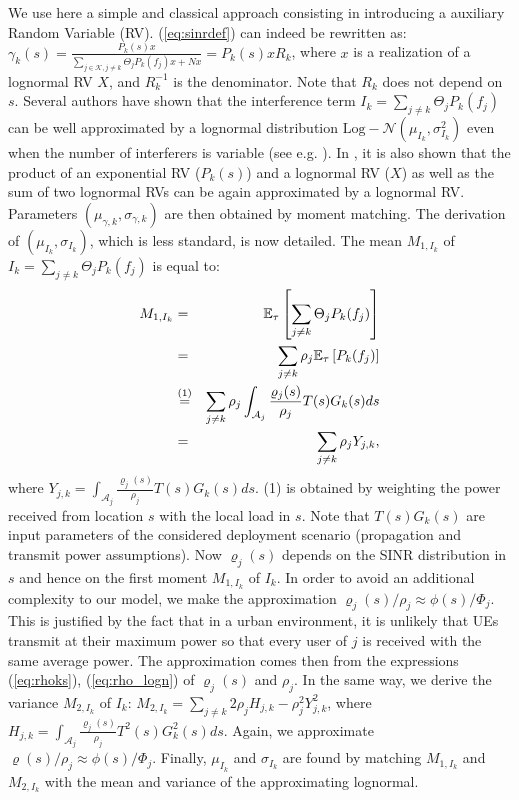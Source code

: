 \documentclass[draftcls,onecolumn]{IEEEtran}
\theoremstyle{plain}
\theoremstyle{definition}
\begin{document}
We use here a simple and classical approach consisting in introducing a auxiliary Random Variable (RV). (\ref{eq:sinrdef}) can indeed be rewritten as: $\gamma_k(s)=\frac{P_{k}(s)x}{\sum_{j \in \mathcal{K}, j\neq k} \Theta_j P_{k}(f_j)x +Nx}=P_k(s)xR_k$, where $x$ is a realization of a lognormal RV $X$, and $R_k^{-1}$ is the denominator. Note that $R_k$ does not depend on $s$. Several authors have shown that the interference term $I_k=\sum_{j\neq k} \Theta_j  P_{k}(f_j)$ can be well approximated by a lognormal distribution $\text{Log}{-}\mathcal{N}(\mu_{I_k},\sigma_{I_k}^2)$ even when the number of interferers is variable (see e.g. \cite{kostic, fischione}). In \cite{kostic}, it is also shown that the product of an exponential RV ($P_k(s)$) and a lognormal RV ($X$) as well as the sum of two lognormal RVs can be again approximated by a lognormal RV. Parameters $(\mu_{\gamma,k},\sigma_{\gamma,k})$ are then obtained by moment matching. The derivation of $(\mu_{I_k},\sigma_{I_k})$, which is less standard, is now detailed.
The mean $M_{1,I_k}$ of $I_k=\sum_{j\neq k} \Theta_j P_{k}(f_j)$ is equal to:
\begin{eqnarray} M_{1,I_k}&=&\mathbb{E}_{\tau}\left[ \sum_{j\neq k} \Theta_j P_{k}(f_j) \right] \notag \\
&=&\sum_{j\neq k} \rho_j \mathbb{E}_{\tau}\left[ P_k(f_j)\right] \notag \\
&\overset{(1)}{=}&\sum_{j\neq k} \rho_j \int_{\mathcal{A}_j} \frac{\varrho_j(s)}{\rho_j}T(s)G_k(s){ds} \notag \\
&=& \sum_{j\neq k} \rho_j Y_{j,k}, \notag
\end{eqnarray}
where $Y_{j,k}=\int_{\mathcal{A}_j} \frac{\varrho_j(s)}{\rho_j} T(s)G_{k}(s){ds}$. (1) is obtained by weighting the power received from location $s$ with the local load in $s$. Note that $T(s)G_{k}(s)$ are input parameters of the considered deployment scenario (propagation and transmit power assumptions). Now $\varrho_j(s)$ depends on the SINR distribution in $s$ and hence on the first moment $M_{1,I_k}$ of $I_k$. In order to avoid an additional complexity to our model, we make the approximation $\varrho_j(s)/\rho_j \approx \phi(s)/\Phi_j$. This is justified by the fact that in a urban environment, it is unlikely that UEs transmit at their maximum power \cite{bulakci13} so that every user of  $j$ is received with the same average power. The approximation comes then from the expressions (\ref{eq:rhoks}), (\ref{eq:rho_logn}) of $\varrho_j(s)$ and $\rho_j$. In the same way, we derive the variance $M_{2,I_k}$ of $I_k$: $M_{2,I_k} = \sum_{j\neq k} 2\rho_j H_{j,k} -\rho_j^2 Y_{j,k}^2$,
where $H_{j,k}=\int_{\mathcal{A}_j} \frac{\varrho_j(s)}{\rho_j} T^2(s)G_{k}^{2}(s){ds}$. Again, we approximate $\varrho(s)/\rho_j \approx \phi(s)/\Phi_j$. Finally, $\mu_{I_k}$ and $\sigma_{I_k}$ are found by matching $M_{1,I_k}$ and $M_{2,I_k}$ with the mean and variance of the approximating lognormal.
\end{document}
